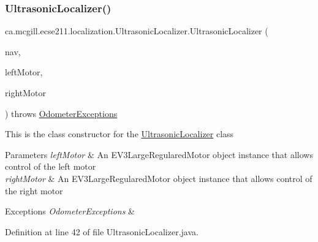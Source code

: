 \subsubsection{\texorpdfstring{Ultrasonic\+Localizer()}{UltrasonicLocalizer()}}
{\footnotesize\ttfamily ca.\+mcgill.\+ecse211.\+localization.\+Ultrasonic\+Localizer.\+Ultrasonic\+Localizer (\begin{DoxyParamCaption}\item[{\hyperlink{classca_1_1mcgill_1_1ecse211_1_1project_1_1_navigation}{Navigation}}]{nav,  }\item[{E\+V3\+Large\+Regulated\+Motor}]{left\+Motor,  }\item[{E\+V3\+Large\+Regulated\+Motor}]{right\+Motor }\end{DoxyParamCaption}) throws \hyperlink{classca_1_1mcgill_1_1ecse211_1_1odometer_1_1_odometer_exceptions}{Odometer\+Exceptions}}

This is the class constructor for the \hyperlink{classca_1_1mcgill_1_1ecse211_1_1localization_1_1_ultrasonic_localizer}{Ultrasonic\+Localizer} class


\begin{DoxyParams}{Parameters}
{\em left\+Motor} & An E\+V3\+Large\+Regulared\+Motor object instance that allows control of the left motor \\
\hline
{\em right\+Motor} & An E\+V3\+Large\+Regulared\+Motor object instance that allows control of the right motor \\
\hline
\end{DoxyParams}

\begin{DoxyExceptions}{Exceptions}
{\em Odometer\+Exceptions} & \\
\hline
\end{DoxyExceptions}


Definition at line 42 of file Ultrasonic\+Localizer.\+java.


